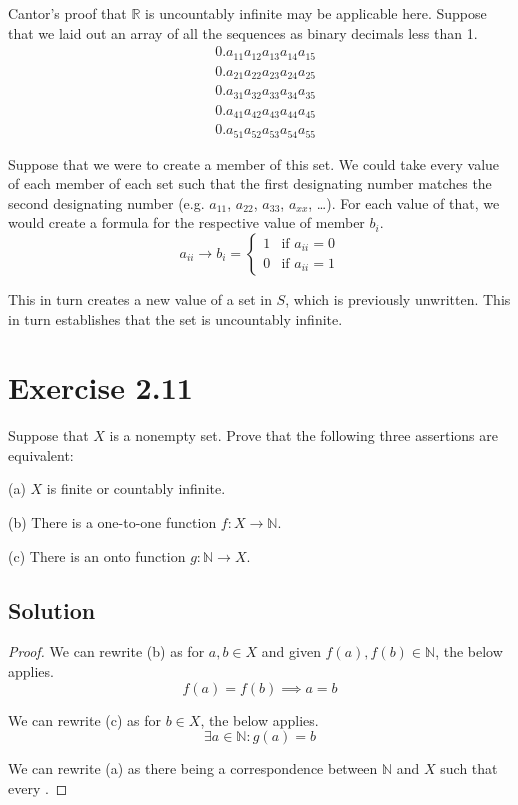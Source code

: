 \documentclass[12pt]{report}
\begin{document}
Cantor's proof that $\mathbb{R}$ is uncountably infinite may be applicable here.
Suppose that we laid out an array of all the sequences as binary decimals less than 1.
\begin{align}
    &0.a_{11}a_{12}a_{13}a_{14}a_{15}\\
    &0.a_{21}a_{22}a_{23}a_{24}a_{25}\\
    &0.a_{31}a_{32}a_{33}a_{34}a_{35}\\
    &0.a_{41}a_{42}a_{43}a_{44}a_{45}\\
    &0.a_{51}a_{52}a_{53}a_{54}a_{55}
\end{align}

Suppose that we were to create a member of this set.
We could take every value of each member of each set such that the first designating number matches the second designating number (e.g. $a_{11}$, $a_{22}$, $a_{33}$, $a_{xx}$, \dots). 
For each value of that, we would create a formula for the respective value of member $b_i$.
\begin{equation}
    a_{ii} \to b_i = \begin{cases}
        1   &\text{if } a_{ii} = 0\\
        0   &\text{if } a_{ii} = 1
    \end{cases}
\end{equation}

This in turn creates a new value of a set in $S$, which is previously unwritten.
This in turn establishes that the set is uncountably infinite.

\pagebreak
\section{Exercise 2.11}
Suppose that $X$ is a nonempty set. Prove that  the following three assertions are equivalent:  

(a) $X$ is finite or countably infinite.  

(b) There is a one-to-one function $f: X \to \mathbb{N}$.  

(c) There is an onto function $g: \mathbb{N} \to X$. 

\subsection*{Solution}
\begin{proof}
    We can rewrite (b) as for $a,b \in X$ and given $f(a), f(b) \in \mathbb{N}$, the below applies.
    \begin{equation}
        f(a) = f(b) \implies a = b 
    \end{equation}

    We can rewrite (c) as for $b \in X$, the below applies. 
    \begin{equation}
        \exists a \in \mathbb{N} : g(a) = b
    \end{equation}

    We can rewrite (a) as there being a correspondence between $\mathbb{N}$ and $X$ such that every .
\end{proof}
\end{document}

